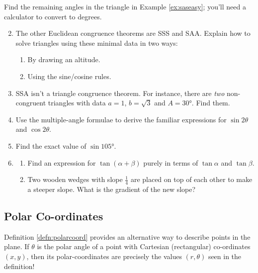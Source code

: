   
\begin{exercises}{}{}
	\exstart Find the remaining angles in the triangle in Example \ref{ex:saseasy}; you'll need a calculator to convert to degrees.
	\begin{enumerate}\setcounter{enumi}{1}
	  \item The other Euclidean congruence theorems are SSS and SAA. Explain how to solve triangles using these minimal data in two ways:
	  \begin{enumerate}
	    \item By drawing an altitude.
	    \item Using the sine/cosine rules.
	  \end{enumerate}
	
	  \item SSA isn't a triangle congruence theorem. For instance, there are \emph{two} non-congruent triangles with data $a=1$, $b=\sqrt 3$ and $A=\ang{30}$. Find them.
	
	
	  \item Use the multiple-angle formulae to derive the familiar expressions for $\sin 2\theta$ and $\cos 2\theta$.
	  
	  \item Find the exact value of $\sin\ang{105}$.
	  
	  \item\begin{enumerate}
	    \item Find an expression for $\tan(\alpha+\beta)$ purely in terms of $\tan\alpha$ and $\tan\beta$.
	  	 \item Two wooden wedges with slope $\frac 14$ are placed on top of each other to make a steeper slope. What is the gradient of the new slope?
	  \end{enumerate} 
	\end{enumerate}
\end{exercises}


\clearpage


\subsection{Polar Co-ordinates}

Definition \ref{defn:polarcoord} provides an alternative way to describe points in the plane. If $\theta$ is the polar angle of a point with Cartesian (rectangular) co-ordinates $(x,y)$, then its polar-coordinates are precisely the values $(r,\theta)$ seen in the definition!\smallbreak

